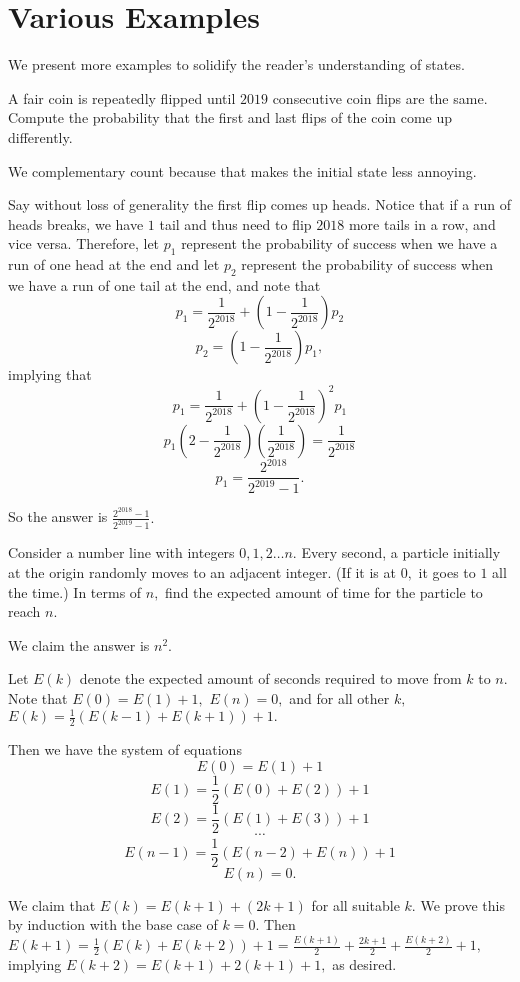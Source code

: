 \documentclass{article}
\begin{document}
\section{Various Examples}
We present more examples to solidify the reader's understanding of states.

\begin{exam}
A fair coin is repeatedly flipped until $2019$ consecutive coin flips are the same. Compute the probability that the first and last flips of the coin come up differently.
\end{exam}

\begin{sol}
We complementary count because that makes the initial state less annoying.

Say without loss of generality the first flip comes up heads. Notice that if a run of heads breaks, we have $1$ tail and thus need to flip $2018$ more tails in a row, and vice versa. Therefore, let $p_1$ represent the probability of success when we have a run of one head at the end and let $p_2$ represent the probability of success when we have a run of one tail at the end, and note that
\[p_1=\frac{1}{2^{2018}}+(1-\frac{1}{2^{2018}})p_2\]
\[p_2=(1-\frac{1}{2^{2018}})p_1,\]
implying that
\[p_1=\frac{1}{2^{2018}}+(1-\frac{1}{2^{2018}})^2p_1\]
\[p_1(2-\frac{1}{2^{2018}})(\frac{1}{2^{2018}})=\frac{1}{2^{2018}}\]
\[p_1=\frac{2^{2018}}{2^{2019}-1}.\]

So the answer is $\frac{2^{2018}-1}{2^{2019}-1}.$
\end{sol}

\begin{exam}
Consider a number line with integers $0,1,2\dots n.$ Every second, a particle initially at the origin randomly moves to an adjacent integer. (If it is at $0,$ it goes to $1$ all the time.) In terms of $n,$ find the expected amount of time for the particle to reach $n.$
\end{exam}

\begin{sol}
We claim the answer is $n^2.$
    
    Let $E(k)$ denote the expected amount of seconds required to move from $k$ to $n.$ Note that $E(0)=E(1)+1,$ $E(n)=0,$ and for all other $k,$ $E(k)=\frac{1}{2}(E(k-1)+E(k+1))+1.$
    
    Then we have the system of equations
    $$E(0)=E(1)+1$$
    $$E(1)=\frac{1}{2}(E(0)+E(2))+1$$
    $$E(2)=\frac{1}{2}(E(1)+E(3))+1$$
    $$\cdots$$
    $$E(n-1)=\frac{1}{2}(E(n-2)+E(n))+1$$
    $$E(n)=0.$$
    
    We claim that $E(k)=E(k+1)+(2k+1)$ for all suitable $k.$ We prove this by induction with the base case of $k=0.$ Then $E(k+1)=\frac{1}{2}(E(k)+E(k+2))+1=\frac{E(k+1)}{2}+\frac{2k+1}{2}+\frac{E(k+2)}{2}+1,$ implying $E(k+2)=E(k+1)+2(k+1)+1,$ as desired.
\end{sol}
\end{document}
